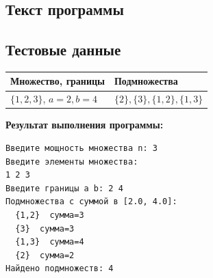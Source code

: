 \subsection{Текст программы}



\subsection{Тестовые данные}

\begin{center}
\begin{tabular}{l|l}
\toprule
Множество, границы & Подмножества \\
\midrule
$\{1,2,3\}$, $a=2,b=4$ & $\{2\},\{3\},\{1,2\},\{1,3\}$ \\
\bottomrule
\end{tabular}
\end{center}

\textbf{Результат выполнения программы:}
\begin{lstlisting}[language={},basicstyle=\ttfamily\small,frame=single]
Введите мощность множества n: 3
Введите элементы множества:
1 2 3
Введите границы a b: 2 4
Подмножества с суммой в [2.0, 4.0]:
  {1,2}  сумма=3
  {3}  сумма=3
  {1,3}  сумма=4
  {2}  сумма=2
Найдено подмножеств: 4
\end{lstlisting}
